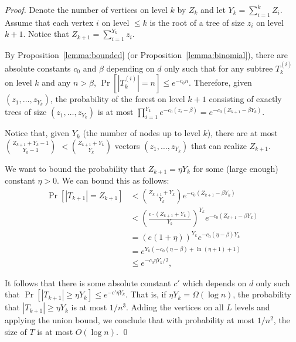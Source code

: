 \documentclass[english, oribibl]{llncs}
\newcommand{\mygamma}{L}
\begin{document}
\begin{proof}
Denote the number of vertices on level $k$ by $Z_k$ and let $Y_k = \sum_{i=1}^k{Z_i}$.
Assume that each vertex $i$ on level $\leq k$ is the root of a tree of size $z_i$ on level $k+1$.
Notice that $Z_{k+1} = \sum_{i=1}^{Y_k}z_i$.

By Proposition~\ref{lemma:bounded} (or Proposition~\ref{lemma:binomial}),
there are absolute constants $c_{0}$ and $\beta$ depending on $d$ only such that
for any subtree $T_{k}^{(i)}$ on level $k$ and any $n > \beta$,
$\Pr[|T_{k}^{(i)}| = n] \leq e^{-c_{0}n}$.
Therefore, given  $(z_1, \ldots, z_{Y_k})$,
the probability of the forest on level $k+1$ consisting of exactly trees of size
$(z_1, \ldots, z_{Y_k})$ is at most $\prod_{i=1}^{Y_k}e^{-c_{0} (z_i-\beta)} = e^{-c_{0} (Z_{k+1}-\beta Y_k)}$.

Notice that, given $Y_k$ (the number of nodes up to level $k$), there are at most $\binom{Z_{k+1} + Y_k - 1}{Y_k - 1} $ $< \binom{Z_{k+1} + Y_k}{Y_k}$ vectors $(z_1, \ldots, z_{Y_k})$ that can realize $Z_{k+1}$. 

We want to bound the probability that $Z_{k+1} = \eta Y_k$ for some (large enough) constant $\eta>0$.
We can bound this as follows:
\begin{align}
\Pr[|T_{k+1}|=Z_{k+1}]
& < \binom{Z_{k+1} + Y_k}{Y_k}e^{-c_{0} (Z_{k+1}-\beta Y_k)} \nonumber\\
& < {\left(\frac{e \cdot( Z_{k+1} + Y_k)}{Y_k}\right)}^{Y_k} e^{-c_{0} (Z_{k+1}-\beta Y_k)} \nonumber\\
&= {\left(e (1 + \eta)\right)}^{Y_k} e^{-c_{0} (\eta-\beta) Y_k} \nonumber\\
&= e^{Y_k (-c_{0} (\eta-\beta)+ \ln(\eta+1)+1)} \nonumber\\
& \leq e^{-c_{0} \eta Y_k/2}\nonumber,
\end{align}




It follows that there is some absolute constant $c'$ which depends on $d$ only such that
$\Pr[|T_{k+1}|\geq \eta Y_k] \leq e^{-c'\eta Y_k}$.
That is, if $\eta Y_k=\Omega(\log n)$,
the probability that $|T_{k+1}|\geq \eta Y_k$ is at most $1/n^{3}$.
Adding the vertices on all $\mygamma$ levels and applying the union bound, we
conclude that with probability at most $1/n^{2}$, the size of $T$ is at most $O(\log n)$. \qed
\end{proof}
\end{document}
